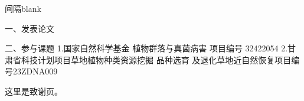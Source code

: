 \documentclass[AutoFakeBold]{LZUThesis-PgD&PhD}
\begin{document}
\blank

间隔blank
\blankpage




\backmatter


\printbib



\Achievements
一、发表论文


\blank

二、参与课题
1.国家自然科学基金 植物群落与真菌病害 项目编号 32422054
2.甘肃省科技计划项目草地植物种类资源挖掘 品种选育 及退化草地近自然恢复项目编号23ZDNA009



\Thanks

这里是致谢页。
\end{document}
